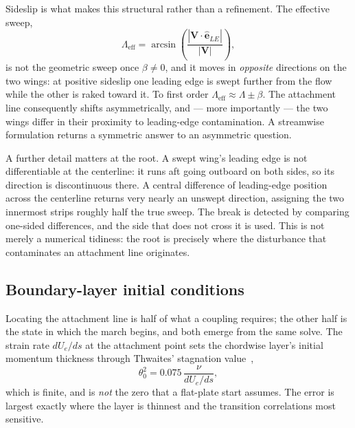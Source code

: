 \documentclass[submit]{aiaa-tc}%
\begin{document}
Sideslip is what makes this structural rather than a refinement. The
effective sweep,
%
\begin{equation}
  \Lambda_{\text{eff}} = \arcsin\!\left(
    \frac{|\mathbf{V}\cdot\hat{\mathbf{e}}_{LE}|}{|\mathbf{V}|}\right),
\end{equation}
%
is not the geometric sweep once $\beta \neq 0$, and it moves in
\emph{opposite} directions on the two wings: at positive sideslip one
leading edge is swept further from the flow while the other is raked
toward it. To first order $\Lambda_{\text{eff}} \approx \Lambda \pm \beta$.
The attachment line consequently shifts asymmetrically, and --- more
importantly --- the two wings differ in their proximity to leading-edge
contamination. A streamwise formulation returns a symmetric answer to an
asymmetric question.

A further detail matters at the root. A swept wing's leading edge is not
differentiable at the centerline: it runs aft going outboard on both
sides, so its direction is discontinuous there. A central difference of
leading-edge position across the centerline returns very nearly an
unswept direction, assigning the two innermost strips roughly half the
true sweep. The break is detected by comparing one-sided differences, and
the side that does not cross it is used. This is not merely a numerical
tidiness: the root is precisely where the disturbance that contaminates an
attachment line originates.

\subsection{Boundary-layer initial conditions}

Locating the attachment line is half of what a coupling requires; the
other half is the state in which the march begins, and both emerge from
the same solve. The strain rate $dU_e/ds$ at the attachment point sets the
chordwise layer's initial momentum thickness through Thwaites'
stagnation value~\cite{thwaites1949},
%
\begin{equation}
  \theta_0^2 = 0.075\,\frac{\nu}{dU_e/ds} ,
\end{equation}
%
which is finite, and is \emph{not} the zero that a flat-plate start
assumes. The error is largest exactly where the layer is thinnest and the
transition correlations most sensitive.
\end{document}

